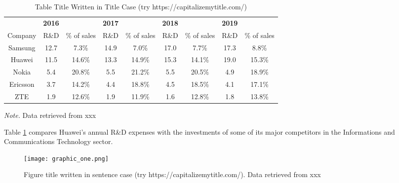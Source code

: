 \documentclass{book}
\begin{document}
\begin{table}
	\caption{Table Title Written in Title Case (try https://capitalizemytitle.com/)}
	\begin{tabular}{ccccccccc}
	\hline
			&	\textbf{2016}	&	&	\textbf{2017}	&				& \textbf{2018}		&				& \textbf{2019}		&				\\
	Company	&	R\&D	&	\% of sales	& R\&D	&	\% of sales	&	R\&D	&	\% of sales	&	R\&D	&	\% of sales	\\
	\hline
	Samsung	& 12.7	&	7.3\%	& 14.9		& 7.0\%			&	17.0	& 7.7\%	& 17.3	& 8.8\% \\
	
	Huawei	& 11.5	& 14.6\%	& 13.3		&	14.9\%		& 15.3		&	14.1\%		& 19.0		& 15.3\% \\
	Nokia	& 5.4	& 20.8\%	& 5.5		& 21.2\%		& 5.5		& 20.5\%		& 4.9		& 18.9\% \\
	Ericsson	& 3.7	& 14.2\%	& 4.4	&	18.8\%		& 4.5		& 18.5\%	& 4.1			& 17.1\% \\	
	ZTE		& 1.9	& 12.6\%	&	1.9		& 11.9\%		& 1.6		& 12.8\%		& 1.8 	& 13.8\% \\
	\hline
	\end{tabular}
	\textit{Note.} Data retrieved from xxx
	\label{tab:RnD_Comparison}
\end{table}



Table \ref{tab:RnD_Comparison} compares Huawei's annual R\&D expenses with the investments of some of its major competitors in the Informations and Communications Technology sector.





\begin{figure}
	\centering
	\texttt{[image: graphic\_one.png]}
	\caption{Figure title written in sentence case (try https://capitalizemytitle.com/). Data retrieved from xxx}
	\label{fig:data}
\end{figure}
\end{document}
